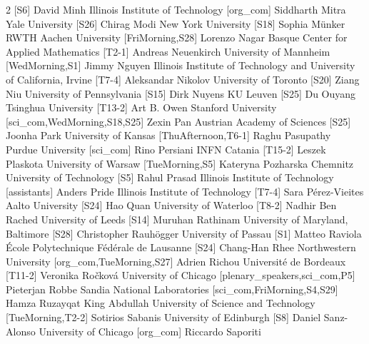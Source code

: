 \begin{multicols}{2}
  [S6]
\participantne
  {David Minh}
  {Illinois Institute of Technology}
  [org_com]
\participantne
  {Siddharth Mitra}
  {Yale University}
  [S26]
\participantne
  {Chirag Modi}
  {New York University}
  [S18]
\participantne
  {Sophia M\"unker}
  {RWTH Aachen University}
  [FriMorning,S28]
\participantne
  {Lorenzo Nagar}
  {Basque Center for Applied Mathematics}
  [T2-1]
\participantne
  {Andreas Neuenkirch}
  {University of Mannheim}
  [WedMorning,S1]
\participantne
  {Jimmy Nguyen}
  {Illinois Institute of Technology and University of California, Irvine}
  [T7-4]
\participantne
  {Aleksandar Nikolov}
  {University of Toronto}
  [S20]
\participantne
  {Ziang Niu}
  {University of Pennsylvania}
  [S15]
\participantne
  {Dirk Nuyens}
  {KU Leuven}
  [S25]
\participantne
  {Du Ouyang}
  {Tsinghua University}
  [T13-2]
\participantne
  {Art B. Owen}
  {Stanford University}
  [sci_com,WedMorning,S18,S25]
\participantne
  {Zexin Pan}
  {Austrian Academy of Sciences}
  [S25]
\participantne
  {Joonha Park}
  {University of Kansas}
  [ThuAfternoon,T6-1]
\participantne
  {Raghu Pasupathy}
  {Purdue University}
  [sci_com]
\participantne
  {Rino Persiani}
  {INFN Catania}
  [T15-2]
\participantne
  {Leszek Plaskota}
  {University of Warsaw}
  [TueMorning,S5]
\participantne
  {Kateryna Pozharska}
  {Chemnitz University of Technology}
  [S5]
\participantne
  {Rahul Prasad}
  {Illinois Institute of Technology}
  [assistants]
\participantne
  {Anders Pride}
  {Illinois Institute of Technology}
  [T7-4]
\participantne
  {Sara P\'erez-Vieites}
  {Aalto University}
  [S24]
\participantne
  {Hao Quan}
  {University of Waterloo}
  [T8-2]
\participantne
  {Nadhir Ben Rached}
  {University of Leeds}
  [S14]
\participantne
  {Muruhan Rathinam}
  {University of Maryland, Baltimore}
  [S28]
\participantne
  {Christopher Rauh\"ogger}
  {University of Passau}
  [S1]
\participantne
  {Matteo Raviola}
  {\'Ecole Polytechnique F\'ed\'erale de Lausanne}
  [S24]
\participantne
  {Chang-Han Rhee}
  {Northwestern University}
  [org_com,TueMorning,S27]
\participantne
  {Adrien Richou}
  {Universit\'e de Bordeaux}
  [T11-2]
\participantne
  {Veronika Ro\v{c}kov\'a}
  {University of Chicago}
  [plenary_speakers,sci_com,P5]
\participantne
  {Pieterjan Robbe}
  {Sandia National Laboratories}
  [sci_com,FriMorning,S4,S29]
\participantne
  {Hamza Ruzayqat}
  {King Abdullah University of Science and Technology}
  [TueMorning,T2-2]
\participantne
  {Sotirios Sabanis}
  {University of Edinburgh}
  [S8]
\participantne
  {Daniel Sanz-Alonso}
  {University of Chicago}
  [org_com]
\participantne
  {Riccardo Saporiti}

\end{multicols}
